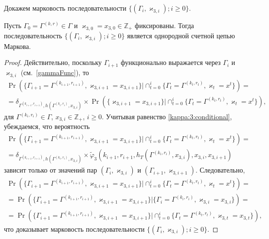 \documentclass[a4paper,12pt,russian]{extarticle}
\newcommand{\MarkThree}{\{(\Gamma_i, \varkappa_{3,i}); i \geqslant 0\}}
\begin{document}
Докажем марковость последовательности $\MarkThree$.
\begin{theorem}
Пусть $\Gamma_0=\Gamma^{(k,r)}\in \Gamma$ и $\varkappa_{3,0}=x_{3,0}\in \mathbb{Z}_+$ фиксированы. Тогда последовательность $\MarkThree$ является однородной счетной цепью Маркова.
\end{theorem}
\begin{proof}
Действительно, поскольку $\Gamma_{i+1}$ функционально выражается через $\Gamma_i$ и $\varkappa_{3,i}$ (см.~\eqref{gammaFunc}), то
\begin{multline*}
\Pr (\{ \Gamma_{i+1} =\Gamma^{(k_{i+1},r_{i+1})},\varkappa_{3,i+1} = x_{3,i+1}\} |\cap_{t=0}^{i}\{ \Gamma_t=\Gamma^{(k_t,r_t)}, \varkappa_t=x^t\})=\\
=\delta_{\Gamma^{(k_{i+1},r_{i+1})},h(\Gamma^{(k_i,r_i)},x_{3,i})}\times \Pr (\{  \varkappa_{3,i+1} = x_{3,i+1}\} |\cap_{t=0}^{i}\{ \Gamma_t=\Gamma^{(k_t,r_t)}, \varkappa_t=x^t\}),
\end{multline*}
для $\Gamma^{(k_i,r_i)}\in \Gamma$, $x_{3,i}\in {\mathbb Z}_+$, $i\geqslant 0$. Учитывая равенство \eqref{kappa:3:conditional}, убеждаемся, что вероятность 
\begin{multline*}
\Pr (\{ \Gamma_{i+1} =\Gamma^{(k_{i+1},r_{i+1})},\varkappa_{3,i+1} = x_{3,i+1}\} |\cap_{t=0}^{i}\{\Gamma_t=\Gamma^{(k_t,r_t)}, \varkappa_t=x^t\}) = \\
=\delta_{\Gamma^{(k_{i+1},r_{i+1})},h(\Gamma^{(k_i,r_i)},x_{3,i})} \times \widetilde{\varphi}_3(k_{i+1},r_{i+1},h_T(\Gamma^{(k_i,r_i)},x_{3,i}),x_{3,i},x_{3,i+1})
\end{multline*}
зависит только от значений пар $(\Gamma_i,\varkappa_{3,i})$ и $(\Gamma_{i+1},\varkappa_{3,i+1})$. Следовательно, 
\begin{multline*}
\Pr (\{ \Gamma_{i+1} =\Gamma^{(k_{i+1},r_{i+1})},\varkappa_{3,i+1} = x_{3,i+1}\} |\cap_{t=0}^{i}\{\Gamma_t=\Gamma^{(k_t,r_t)}, \varkappa_t=x^t\})=\\
=\Pr (\{  \Gamma_{i+1} =\Gamma^{(k_{i+1},r_{i+1})},\varkappa_{3,i+1} = x_{3,i+1}\} |\{ \Gamma_i=\Gamma^{(k_i,r_i)}, \varkappa_{3,i}=x_{3,i}\}) = \\
=\Pr (\{ \Gamma_{i+1} =\Gamma^{(k_{i+1},r_{i+1})},\varkappa_{3,i+1} = x_{3,i+1}\} |\cap_{t=0}^{i}\{ \Gamma_t=\Gamma^{(k_t,r_t)}, \varkappa_{3,t}=x_{3,t}\}),
\end{multline*}
что доказывает марковость последовательности $\MarkThree$.
\end{proof}
\end{document}
